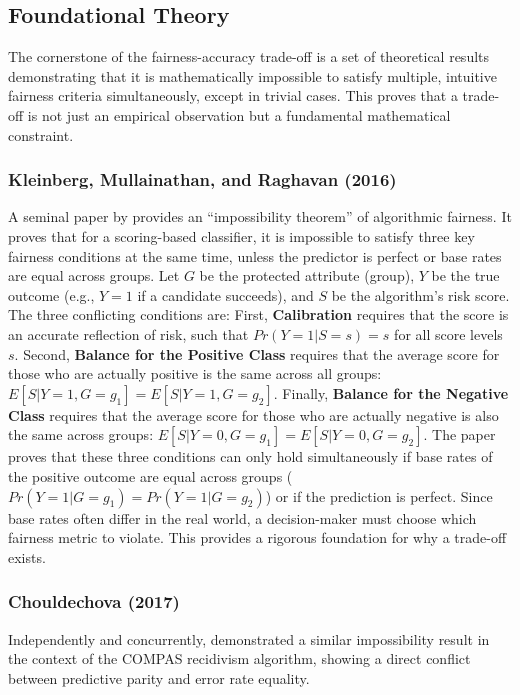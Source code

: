 \subsection{Foundational Theory}

The cornerstone of the fairness-accuracy trade-off is a set of theoretical results demonstrating that it is mathematically impossible to satisfy multiple, intuitive fairness criteria simultaneously, except in trivial cases. This proves that a trade-off is not just an empirical observation but a fundamental mathematical constraint.

\subsubsection{Kleinberg, Mullainathan, and Raghavan (2016)}

A seminal paper by \citet{Kleinberg2017} provides an ``impossibility theorem'' of algorithmic fairness. It proves that for a scoring-based classifier, it is impossible to satisfy three key fairness conditions at the same time, unless the predictor is perfect or base rates are equal across groups. Let $G$ be the protected attribute (group), $Y$ be the true outcome (e.g., $Y=1$ if a candidate succeeds), and $S$ be the algorithm's risk score. The three conflicting conditions are:
First, \textbf{Calibration} requires that the score is an accurate reflection of risk, such that $Pr(Y=1 | S=s) = s$ for all score levels $s$. Second, \textbf{Balance for the Positive Class} requires that the average score for those who are actually positive is the same across all groups: $E[S | Y=1, G=g_1] = E[S | Y=1, G=g_2]$. Finally, \textbf{Balance for the Negative Class} requires that the average score for those who are actually negative is also the same across groups: $E[S | Y=0, G=g_1] = E[S | Y=0, G=g_2]$.
The paper proves that these three conditions can only hold simultaneously if base rates of the positive outcome are equal across groups ($Pr(Y=1 | G=g_1) = Pr(Y=1 | G=g_2)$) or if the prediction is perfect. Since base rates often differ in the real world, a decision-maker must choose which fairness metric to violate. This provides a rigorous foundation for why a trade-off exists.

\subsubsection{Chouldechova (2017)}

Independently and concurrently, \citet{Chouldechova2017} demonstrated a similar impossibility result in the context of the COMPAS recidivism algorithm, showing a direct conflict between predictive parity and error rate equality.

